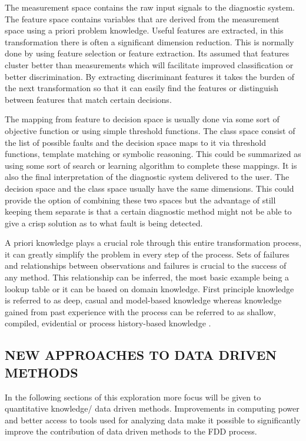 The measurement space contains the raw input signals to the diagnostic system. The feature space contains variables that are derived from the measurement space using a priori problem knowledge. Useful features are extracted, in this transformation there is often a significant dimension reduction. This is normally done by using feature selection or feature extraction. Its assumed that features cluster better than measurements which will facilitate improved classification or better discrimination. By extracting discriminant features it takes the burden of the next transformation so that it can easily find the features or distinguish between features that match certain decisions.\par
The mapping from feature to decision space is usually done via some sort of objective function or using simple threshold functions. The class space consist of the list of possible faults and the decision space maps to it via threshold functions, template matching or symbolic reasoning. This could be summarized as using some sort of search or learning algorithm to complete these mappings. It is also the final interpretation of the diagnostic system delivered to the user. The decision space and the class space usually have the same dimensions. This could provide the option of combining these two spaces but the advantage of still keeping them separate is that a certain diagnostic method might not be able to give a crisp solution as to what fault is being detected.\par

A priori knowledge plays a crucial role through this entire transformation process, it can greatly simplify the problem in every step of the process. Sets of failures and relationships between observations and failures is crucial to the success of any method. This relationship can be inferred, the most basic example being a lookup table or it can be based on domain knowledge. First principle knowledge is referred to as deep, casual and model-based knowledge whereas knowledge gained from past experience with the process can be referred to as shallow, compiled, evidential or process history-based knowledge \cite{venkatasubramanian2003review}.\par

\subsection{NEW APPROACHES TO DATA DRIVEN METHODS}

In the following sections of this exploration more focus will be given to quantitative knowledge/ data driven methods. Improvements in computing power and better access to tools used for analyzing data make it possible to significantly improve the contribution of data driven methods to the FDD process.\par

